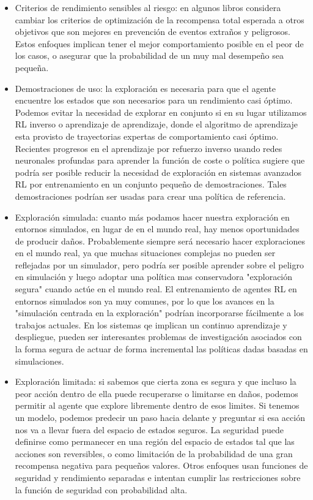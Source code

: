 \documentclass[12pt,a4paper]{article}
\begin{document}
\begin{itemize}
\item Criterios de rendimiento sensibles al riesgo: en algunos libros considera cambiar los criterios de optimización de la recompensa total esperada a otros objetivos que son mejores en prevención de eventos extraños y peligrosos. Estos enfoques implican tener el mejor comportamiento posible en el peor de los casos, o asegurar que la probabilidad de un muy mal desempeño sea pequeña.

\item Demostraciones de uso: la exploración es necesaria para que el agente encuentre los estados que son necesarios para un rendimiento casi óptimo. Podemos evitar la necesidad de explorar en conjunto si en su lugar utilizamos RL inverso o aprendizaje de aprendizaje, donde el algoritmo de aprendizaje esta provisto de trayectorias expertas de comportamiento casi óptimo. Recientes progresos en el aprendizaje por refuerzo inverso usando redes neuronales profundas para aprender la función de coste o política sugiere que podría ser posible reducir la necesidad de exploración en sistemas avanzados RL por entrenamiento en un conjunto pequeño de demostraciones. Tales demostraciones podrían ser usadas para crear una política de referencia.

\item Exploración simulada: cuanto más podamos hacer nuestra exploración en entornos simulados, en lugar de en el mundo real, hay menos oportunidades de producir daños. Probablemente siempre será necesario hacer exploraciones en el mundo real, ya que muchas situaciones complejas no pueden ser reflejadas por un simulador, pero podría ser posible aprender sobre el peligro en simulación y luego adoptar una política mas conservadora "exploración segura" cuando actúe en el mundo real. El entrenamiento de agentes RL en entornos simulados son ya muy comunes, por lo que los avances en la "simulación centrada en la exploración" podrían incorporarse fácilmente a los trabajos actuales. En los sistemas qe implican un continuo aprendizaje y despliegue, pueden ser interesantes problemas de investigación asociados con la forma segura de actuar de forma incremental las políticas dadas  basadas en simulaciones.

\item Exploración limitada: si sabemos que cierta zona es segura y que incluso la peor acción dentro de ella puede recuperarse o limitarse en daños, podemos permitir al agente que explore libremente dentro de esos limites. Si tenemos un modelo, podemos predecir un paso hacia delante y preguntar si esa acción nos va a llevar fuera del espacio de estados seguros. La seguridad puede definirse como permanecer en una región  del espacio de estados tal que las acciones son reversibles, o como limitación de la probabilidad de una gran recompensa negativa para pequeños valores. Otros enfoques usan funciones de seguridad y rendimiento separadas e intentan cumplir las restricciones sobre la función de seguridad con probabilidad alta.


\end{itemize}
\end{document}

